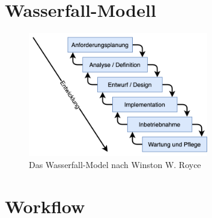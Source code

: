 \documentclass[notables, nomenclature, oneside, 150]{HSMW-Thesis}
\begin{document}
	

\Anhang

\chapter{Wasserfall-Modell}
	\begin{figure}[th]
   		\centering
   		\includegraphics[width=0.7\textwidth]{img/waterfall}
   		\caption{Das Wasserfall-Model nach Winston W. Royce}
   		\label{fig:waterfall}
   \end{figure}

\chapter{Workflow} \label{ch:workflow}
\end{document}
